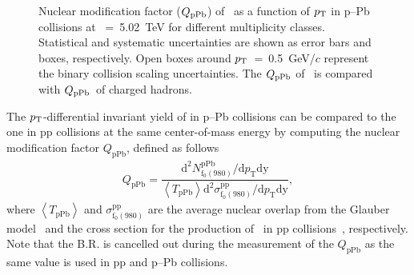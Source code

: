 \begin{figure}[!hbt]
	\centering
	\caption{ Nuclear modification factor ($Q_{\rm{pPb}}$) of \fzero~as a function of $p_{\rm{T}}$ in p--Pb collisions at \snn~=~5.02~TeV for different multiplicity classes. Statistical and systematic uncertainties are shown as error bars and boxes, respectively. Open boxes around $p_{\rm{T}}$~=~0.5~GeV/$c$ represent the binary collision scaling uncertainties. The $Q_{\rm{pPb}}$ of \fzero~is compared with $Q_{\rm{pPb}}$~of charged hadrons. }
	\label{fig:QpPb}
\end{figure}

The $p_{\rm{T}}$-differential invariant yield of \fzero in p--Pb collisions can be compared to the one in pp collisions at the same center-of-mass energy by computing the nuclear modification factor $Q_{\mbox{pPb}}$, defined as follows
\begin{eqnarray}
Q_{\mbox{pPb}} = \dfrac{\mathrm{d}^{2} N_{\mathrm{f}_{0}(980)}^{\mathrm{pPb}} / \mathrm{d} p_{\mathrm{T}} \mathrm{dy} }{ \left\langle T_{\mathrm{pPb}} \right\rangle \mathrm{d}^{2} \sigma_{\mathrm{f}_{0}(980)}^{\mathrm{pp}}/ \mathrm{d} p_{\mathrm{T}} \mathrm{dy} },
\end{eqnarray}
where $\left\langle T_{\mathrm{pPb}} \right\rangle$ and $\sigma_{\mathrm{f}_{0}(980)}^{\mathrm{pp}}$ are the average nuclear overlap from the Glauber model~\cite{Miller:2007ri} and the cross section for the production of \fzero~in pp collisions~\cite{ALICE:2022qnb}, respectively. Note that the B.R. is cancelled out during the measurement of the $Q_{\mbox{pPb}}$ as the same value is used in pp and p--Pb collisions.

